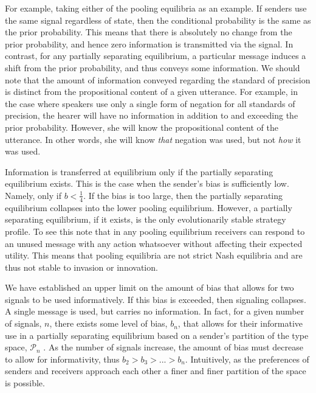 \documentclass[12pt]{article}
\theoremstyle{definition} \newtheorem{definition}{Definition}
\begin{document}
For example, taking either of the pooling equilibria as an example.  If senders use the same signal regardless of state, then the conditional probability is the same as the prior probability. This means that there is absolutely no change from the prior probability, and hence zero information is transmitted via the signal. In contrast, for any partially separating equilibrium, a particular message induces a shift from the prior probability, and thus conveys some information. We should note that the amount of information conveyed regarding the standard of precision is distinct from the propositional content of a given utterance. For example, in the case where speakers use only a single form of negation for all standards of precision, the hearer will have no information in addition to and exceeding the prior probability. However, she will know the propositional content of the utterance. In other words, she will know \emph{that} negation was used, but not \emph{how} it was used.


Information is transferred at equilibrium only if the partially separating equilibrium exists. This is the case when the sender's bias is sufficiently low. Namely, only if $b < \frac{1}{4}$. If the bias is too large, then the partially separating equilibrium collapses into the lower pooling equilibrium.  However, a partially separating equilibrium, if it exists, is the only evolutionarily stable strategy profile. To see this note that in any pooling equilibrium receivers can respond to an unused message with any action whatsoever without affecting their expected utility. This means that pooling equilibria are not strict Nash equilibria and are thus not stable to invasion or innovation. 

% 

We have established an upper limit on the amount of bias that allows for two signals to be used informatively. If this bias is exceeded, then signaling collapses. A single message is used, but carries no information. In fact, for a given number of signals, $n$, there exists some level of bias, $b_n$, that allows for their informative use in a partially separating equilibrium based on a sender's partition of the type space, $\mathcal{P}_n$ \citep{crawford-sobel:1982}. As the number of signals increase, the amount of bias must decrease to allow for informativity, thus $b_2 > b_3 > ... > b_n$. Intuitively, as the preferences of senders and receivers approach each other a finer and finer partition of the space is possible.
\end{document}
